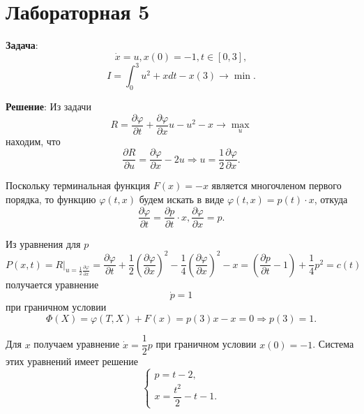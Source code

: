 \documentclass[a4paper, 12pt]{article}
\newcommand{\df}[2]{\frac{\partial #1}{\partial #2}}
\begin{document}
\section{Лабораторная 5}
{\bf Задача}:
\begin{equation}
    \dot x = u , x(0)=-1, t \in [0,3],
\end{equation}
\begin{equation}
    I=\int_0^3 u^2+x dt - x(3) \rightarrow \min.
\end{equation}

{\bf Решение}:
Из задачи
\begin{equation}
    R= \df{\varphi}{t}+\df{\varphi}{x} u - u^2-x \rightarrow \max_u
\end{equation}
находим, что
\begin{equation}
    \df{R}{u}=\df{\varphi}{x} - 2u \Rightarrow u= \dfrac{1}{2} \df{\varphi}{x}.
\end{equation}

Поскольку терминальная функция $F(x)=-x$ является многочленом первого порядка, то функцию $\varphi(t,x)$ будем искать в виде $\varphi(t,x)=p(t)\cdot x$, откуда
\begin{equation}
    \df{\varphi}{t}= \df{p}{t} \cdot x, \df{\varphi}{x}=p. 
\end{equation}

Из уравнения для $p$
\begin{equation}
    P(x,t)=R|_{u=\frac{1}{2} \df{\varphi}{x}}=\df{\varphi}{t}+\dfrac{1}{2} \left(\df{\varphi}{x} \right)^2-\dfrac{1}{4} \left(\df{\varphi}{x} \right)^2-x=\left(\df{p}{t}-1 \right) +\dfrac{1}{4}p^2=c(t)
\end{equation}
получается уравнение
\begin{equation}
    \dot p=1
\end{equation}
при граничном условии
\begin{equation}
    \Phi (X) = \varphi (T,X)+F(x)=p(3) x-x=0 \Rightarrow p(3)=1.
\end{equation}

Для $x$ получаем уравнение $\dot x = \dfrac{1}{2} p$ при граничном условии $x(0)=-1$. Система этих уравнений имеет решение
\begin{equation}
    \begin{cases}
        p=t-2,\\
        x=\dfrac{t^2}{2}-t-1.
    \end{cases}
\end{equation}
\end{document}
